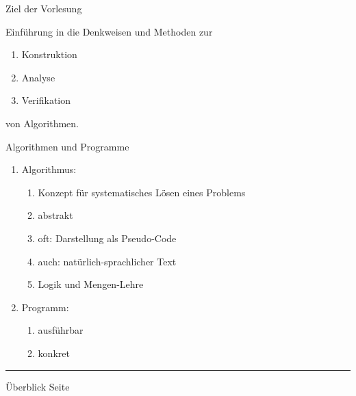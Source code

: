 \documentclass{slides}
\newcounter{mypage}
\begin{document}

\begin{slide}{}
 \begin{center}
Ziel der Vorlesung
\end{center}

\footnotesize
 Einf\"uhrung in die Denkweisen und Methoden zur
\begin{enumerate}
\item Konstruktion
\item Analyse
\item Verifikation
\end{enumerate}
von Algorithmen.

\normalsize
\begin{center}
Algorithmen und Programme
\end{center}

\footnotesize
\begin{enumerate}
\item Algorithmus: 
  \begin{enumerate}
  \item Konzept f\"ur systematisches L\"osen eines Problems
  \item abstrakt
  \item oft: Darstellung als Pseudo-Code
  \item auch: nat\"urlich-sprachlicher Text
  \item Logik und Mengen-Lehre
  \end{enumerate}
\item Programm:
  \begin{enumerate}
  \item ausf\"uhrbar
  \item konkret
  \end{enumerate}
\end{enumerate}

\vspace*{\fill}
\tiny \addtocounter{mypage}{1}
\rule{17cm}{1mm}
Überblick  \hspace*{\fill} Seite 
\end{slide}

\end{document}
